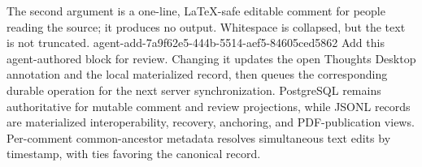The second argument is a one-line, LaTeX-safe editable comment for people
reading the source; it produces no output.
Whitespace is collapsed, but the text is not truncated.
\agentProposedEdit
  {agent-add-7a9f62e5-444b-5514-aef5-84605ced5862}
  {Add this agent-authored block for review.}
  {}
  {Changing it updates the open Thoughts Desktop annotation and the local materialized  record, then queues the corresponding durable operation for the next server synchronization.
PostgreSQL remains authoritative for mutable comment and review projections, while JSONL records are materialized interoperability, recovery, anchoring, and PDF-publication views.}
Per-comment common-ancestor metadata resolves simultaneous text edits by
timestamp, with ties favoring the canonical record.

